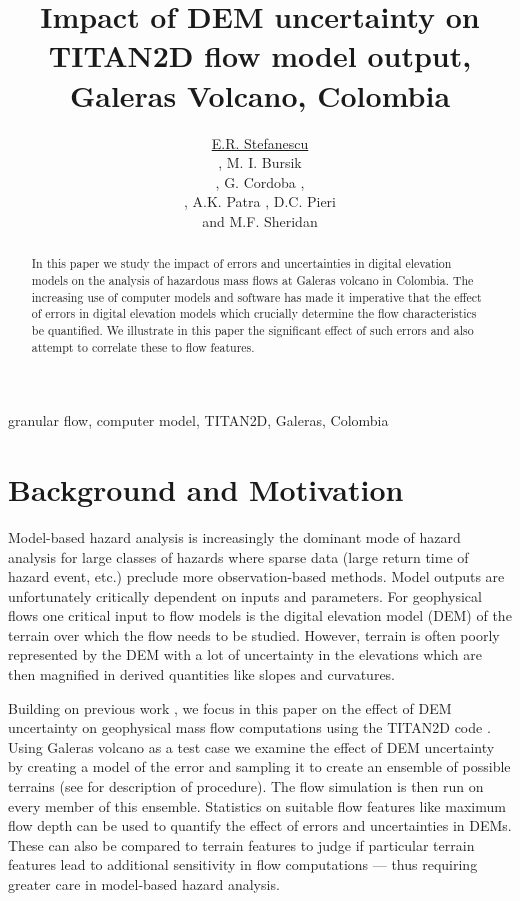 \documentclass[a4paper,fleqn]{article}
\title{Impact of DEM uncertainty on TITAN2D flow model output, Galeras
  Volcano, Colombia}
\author{\underline{E.R. Stefanescu} \address[A1]{\it{Department of Mechanical \& Aerospace Engineering, University at Buffalo, SUNY,
Buffalo,NY 14260 , (ers32@buffalo.edu, abani@buffalo.edu)}}, 
M. I. Bursik\address[B1]{\it{Dept. of Geology, University at Buffalo, SUNY,
Buffalo,NY 14260 , (mib@buffalo.edu, gcordoba@buffalo.edu, mfs@buffalo.edu)}}, G. Cordoba \addressmark[B1],\address[D1]{\it{Universidad de Nari\~{n}o, Colombia}}, A.K. Patra \addressmark[A1], D.C. Pieri \address[C1]{\it{Jet Propulsion Laboratory, Caltech, Pasadena, CA, 91109 USA, (dave.pieri@jpl.nasa.gov)}} and M.F. Sheridan\addressmark[B1] }
\begin{document}
\begin{abstract}
  In this paper we study the impact of errors and uncertainties in
  digital elevation models on the analysis of hazardous mass flows at
  Galeras volcano in Colombia.  The increasing use of computer models
  and software has made it imperative that the effect of errors in
  digital elevation models which crucially determine the flow
  characteristics be quantified. We illustrate in this paper the
  significant effect of such errors and also attempt to correlate
  these to flow features.
\end{abstract}
\begin{keyword}
  granular flow, computer model, TITAN2D, Galeras, Colombia
\end{keyword}

\maketitle

\section{Background and Motivation}
Model-based hazard analysis is increasingly the dominant mode of
hazard analysis for large classes of hazards where sparse data (large
return time of hazard event, etc.)  preclude more observation-based
methods. Model outputs are unfortunately critically dependent on
inputs and parameters. For geophysical flows one critical input to
flow models is the digital elevation model (DEM) of the terrain over
which the flow needs to be studied. However, terrain is often poorly
represented by the DEM with a lot of uncertainty in the elevations
which are then magnified in derived quantities like slopes and
curvatures. 

Building on previous work \citep{stefanescu1}, we focus in this paper
on the effect of DEM uncertainty on geophysical mass flow computations
using the TITAN2D code \citep{Patra2005}. Using Galeras volcano as a test case we
examine the effect of DEM uncertainty by creating a model of the error
and sampling it to create an ensemble of possible terrains (see
\citet{stefanescu2} for description of procedure). The flow simulation
is then run on every member of this ensemble.  Statistics on suitable
flow features like maximum flow depth can be used to quantify the
effect of errors and uncertainties in DEMs. These can also be compared
to terrain features to judge if particular terrain features lead to
additional sensitivity in flow computations --- thus requiring greater
care in model-based hazard analysis.
\end{document}
